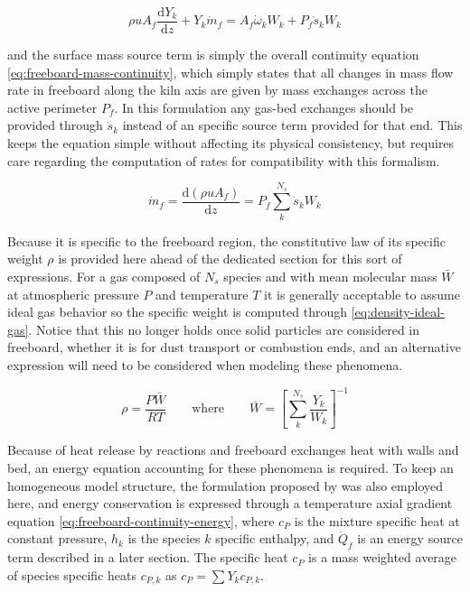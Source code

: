 \documentclass[11pt]{paper}
\begin{document}
\begin{equation}
\rho{}uA_{f}\frac{\mathrm{d}Y_{k}}{\mathrm{d}z}
+Y_{k}\dot{m}_{f}=
A_{f}\dot{\omega}_{k}W_{k}
+P_{f}\dot{s}_{k}W_{k}
\label{eq:freeboard-yk-continuity-final}
\end{equation}

\noindent{}and the surface mass source term is simply the overall continuity equation \eqref{eq:freeboard-mass-continuity}, which simply states that all changes in mass flow rate in freeboard along the kiln axis are given by mass exchanges across the active perimeter $P_{f}$. In this formulation any gas-bed exchanges should be provided through $\dot{s}_{k}$ instead of an specific source term provided for that end. This keeps the equation simple without affecting its physical consistency, but requires care regarding the computation of rates for compatibility with this formalism.

\begin{equation}
\dot{m}_{f}
=\frac{\mathrm{d}(\rho{}uA_{f})}{\mathrm{d}z}
=P_{f}\sum_{k}^{N_s}\dot{s}_{k}W_{k}
\label{eq:freeboard-mass-continuity}
\end{equation}

Because it is specific to the freeboard region, the constitutive law of its specific weight $\rho$ is provided here ahead of the dedicated section for this sort of expressions. For a gas composed of $N_{s}$ species and with mean molecular mass $\bar{W}$ at atmospheric pressure $P$ and temperature $T$ it is generally acceptable to assume ideal gas behavior so the specific weight is computed through \eqref{eq:density-ideal-gas}. Notice that this no longer holds once solid particles are considered in freeboard, whether it is for dust transport or combustion ends, and an alternative expression will need to be considered when modeling these phenomena.

\begin{equation}
\rho=\frac{P\bar{W}}{RT}\qquad\text{where}\qquad\bar{W}=\left[\sum_{k}^{N_s}\frac{Y_{k}}{W_{k}}\right]^{-1}
\label{eq:density-ideal-gas}
\end{equation}

Because of heat release by reactions and freeboard exchanges heat with walls and bed, an energy equation accounting for these phenomena is required. To keep an homogeneous model structure, the formulation proposed by \textcite{Kee2017} was also employed here, and energy conservation is expressed through a temperature axial gradient equation \eqref{eq:freeboard-continuity-energy}, where $c_{P}$ is the mixture specific heat at constant pressure, $h_{k}$ is the species $k$ specific enthalpy, and $\dot{Q}_{f}$ is an energy source term described in a later section. The specific heat $c_{P}$ is a mass weighted average of species specific heats $c_{P,k}$ as $c_{P}=\sum{}Y_{k}c_{P,k}$.
\end{document}

